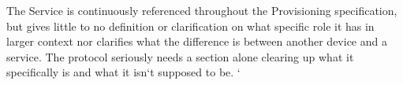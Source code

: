 The Service is continuously referenced throughout the Provisioning
specification, but gives little to no definition or clarification on what
specific role it has in larger context nor clarifies what the difference is
between another device and a service. The protocol seriously needs a section
alone clearing up what it specifically is and what it isn`t supposed to be. `
